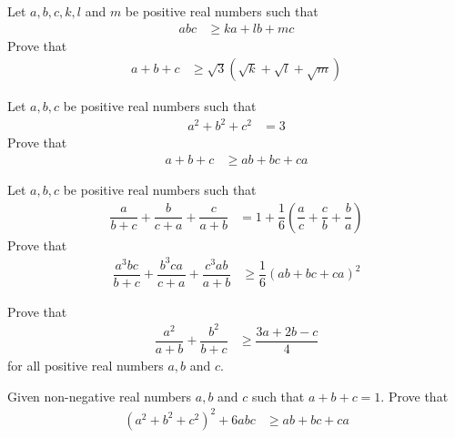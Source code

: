 \documentclass{subfile}
\begin{document}
		\begin{problem}[$2011$ Round $3$]
			Let $a,b,c,k,l$ and $m$ be positive real numbers such that
				\begin{align*}
					abc
						& \geq ka+lb+mc
				\end{align*}
			Prove that
				\begin{align*}
					a+b+c
						& \geq \sqrt{3}(\sqrt{k}+\sqrt{l}+\sqrt{m})
				\end{align*}
		\end{problem}
	
		\begin{problem}
			Let $a,b,c$ be positive real numbers such that
				\begin{align*}
					a^{2}+b^{2}+c^{2}
						& = 3
				\end{align*}
			Prove that
				\begin{align*}
					a+b+c
						& \geq ab+bc+ca
				\end{align*}
		\end{problem}
	
		\begin{problem}[$2011$ Test $5$]
			Let $a,b,c$ be positive real numbers such that
				\begin{align*}
					\dfrac{a}{b+c}+\dfrac{b}{c+a}+\dfrac{c}{a+b}
						& = 1+\dfrac{1}{6}\left(\dfrac{a}{c}+\dfrac{c}{b}+\dfrac{b}{a}\right)
				\end{align*}
			Prove that
				\begin{align*}
					\dfrac{a^{3}bc}{b+c}+\dfrac{b^{3}ca}{c+a}+\dfrac{c^{3}ab}{a+b}
						& \geq \dfrac{1}{6}(ab+bc+ca)^{2}
				\end{align*}
		\end{problem}
	
		\begin{problem}
			Prove that
				\begin{align*}
					\dfrac{a^{2}}{a+b}+\dfrac{b^{2}}{b+c}
						& \geq \dfrac{3a+2b-c}{4}
				\end{align*}
			for all positive real numbers $a,b$ and $c$.
		\end{problem}
	
		\begin{problem}[$2010$ Test $1$]
			Given non-negative real numbers $a,b$ and $c$ such that $a+b+c=1$. Prove that
				\begin{align*}
					\left(a^{2}+b^{2}+c^{2}\right)^{2}+6abc
						& \geq ab+bc+ca
				\end{align*}
		\end{problem}
	
\end{document}
